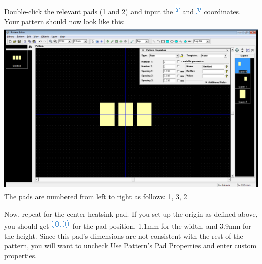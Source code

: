 \documentclass[letterpaper]{article}
\begin{document}
{\sffamily\color[rgb]{0.30980393,0.5058824,0.7411765}
Double-click the relevant pads (1 and 2) and input the 
\includegraphics[width=0.1043in,height=0.2083in]{figures/ee4document-img037.png}  and 
\includegraphics[width=0.1043in,height=0.2083in]{figures/ee4document-img034.png}  coordinates. Your pattern should now look
like this:\newline
 \includegraphics[width=5.4in,height=3.3665in]{figures/ee4document-img038.png} \newline
The pads are numbered from left to right as follows: 1, 3, 2}

{\sffamily\color[rgb]{0.30980393,0.5058824,0.7411765}
Now, repeat for the center heatsink pad. If you set up the origin as defined above, you should get 
\includegraphics[width=0.3854in,height=0.2083in]{figures/ee4document-img039.png}  for the pad position, 1.1mm for the width,
and 3.9mm for the height. Since this pad's dimensions are not consistent with the rest of the pattern, you will want to
uncheck {\textquotedbl}Use Pattern's Pad Properties{\textquotedbl} and enter custom properties.}
\end{document}

